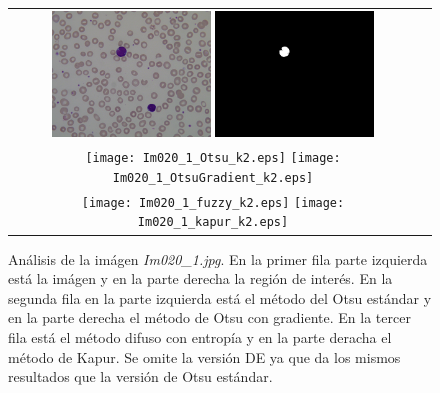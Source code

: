 \documentclass[preprint,12pt]{elsarticle}
\begin{document}
\begin{figure}[H]
\centering
\begin{tabular}{cc}
   \includegraphics[width=0.4\textwidth]{Im020_1.jpg}
   \includegraphics[width=0.4\textwidth]{Im020_1_Reference.jpg} \\
      \texttt{[image: Im020\_1\_Otsu\_k2.eps]}
   \texttt{[image: Im020\_1\_OtsuGradient\_k2.eps]} \\
      \texttt{[image: Im020\_1\_fuzzy\_k2.eps]}
   \texttt{[image: Im020\_1\_kapur\_k2.eps]}
\end{tabular}
\caption{Análisis de la imágen \textit{Im020\_1.jpg}. En la primer fila parte izquierda está la imágen y en la parte derecha la región de interés. En la segunda fila en la parte izquierda está el método del Otsu estándar y en la parte derecha el método de Otsu con gradiente. En la tercer fila está el método difuso con entropía y en la parte deracha el método de Kapur. Se omite la versión DE ya que da los mismos resultados que la versión de Otsu estándar.}\label{img:20}
\end{figure}
\end{document}
